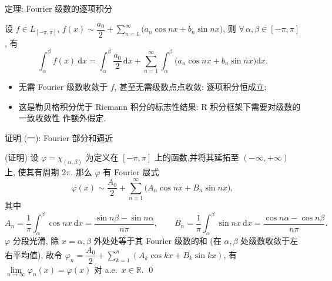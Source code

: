 \begin{frame}{定理: Fourier 级数的逐项积分}

\begin{thm}[逐项积分]
设 $f \in L_{[-\pi, \pi]}$,
$f(x) \sim \dfrac{a_0}{2} + \sum_{n=1}^{\infty} \big( a_n \cos nx + b_n \sin nx \big)$,
则 $\forall\, \alpha, \beta \in [-\pi, \pi]$, 有
\[
\int_{\alpha}^{\beta} f(x) ~ \mathrm{d} x
= \int_{\alpha}^{\beta} \frac{a_0}{2}\, \mathrm{d} x
+ \sum_{n=1}^{\infty} \int_{\alpha}^{\beta}
\big( a_n \cos nx + b_n \sin nx \big) \mathrm{d} x .
\]
\end{thm}

\pause

\begin{itemize}
\item 无需 Fourier 级数\alert{收敛}于 $f$, 甚至无需级数点点收敛: 逐项积分\alert{恒}成立;
\item 这是勒贝格积分优于 Riemann 积分的标志性结果: R 积分框架下需要对级数的一致收敛性
  作额外假定.
\end{itemize}

\end{frame}


\begin{frame}{证明 (一): Fourier 部分和逼近}

\startproof[bg=yellow, fg=red](证明)
设 $\varphi = \chi_{(\alpha, \beta)}$ 为定义在 $[-\pi, \pi]$ 上的函数,并将其延拓至
$(-\infty, +\infty)$ 上, 使其有周期 $2\pi$. 那么 $\varphi$ 有 Fourier 展式
\[
\varphi(x) \sim \frac{A_0}{2} + \sum_{n=1}^{\infty}
\big( A_n \cos nx + B_n \sin nx \big),
\]
其中
\[
A_n = \frac{1}{\pi} \int_{\alpha}^{\beta} \cos nx ~ \mathrm{d} x
= \frac{\sin n\beta - \sin n\alpha}{n\pi},
\qquad
B_n = \frac{1}{\pi} \int_{\alpha}^{\beta} \sin nx ~ \mathrm{d} x
= \frac{\cos n\alpha - \cos n\beta}{n\pi} .
\]
$\varphi$ 分段光滑, 除 $x = \alpha, \beta$ 外处处等于其 Fourier 级数的和
(在 $\alpha, \beta$ 处级数收敛于左右平均值), 故令
$\varphi_n = \dfrac{A_0}{2} + \sum_{k=1}^{n} (A_k \cos kx + B_k \sin kx)$, 有
$\lim\limits_{n \to \infty} \varphi_n(x) = \varphi(x)$ 对 a.e.\ $x \in \mathbb{R}$.
\qed

\end{frame}


